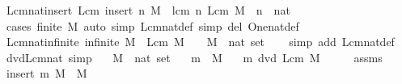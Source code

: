 \begin{isabellebody}
\ Lcm{\isacharunderscore}{\kern0pt}nat{\isacharunderscore}{\kern0pt}insert{\isacharcolon}{\kern0pt}\ {\isachardoublequoteopen}Lcm\ {\isacharparenleft}{\kern0pt}insert\ n\ M{\isacharparenright}{\kern0pt}\ {\isacharequal}{\kern0pt}\ lcm\ n\ {\isacharparenleft}{\kern0pt}Lcm\ M{\isacharparenright}{\kern0pt}{\isachardoublequoteclose}\ \ n\ {\isacharcolon}{\kern0pt}{\isacharcolon}{\kern0pt}\ nat\isanewline
%
\isadelimproof
\ \ %
\endisadelimproof
%
\isatagproof
{}\isamarkupfalse%
\ {\isacharparenleft}{\kern0pt}cases\ {\isachardoublequoteopen}finite\ M{\isachardoublequoteclose}{\isacharparenright}{\kern0pt}\ {\isacharparenleft}{\kern0pt}auto\ simp{\isacharcolon}{\kern0pt}\ Lcm{\isacharunderscore}{\kern0pt}nat{\isacharunderscore}{\kern0pt}def\ simp\ del{\isacharcolon}{\kern0pt}\ One{\isacharunderscore}{\kern0pt}nat{\isacharunderscore}{\kern0pt}def{\isacharparenright}{\kern0pt}%
\endisatagproof
{\isafoldproof}%
%
\isadelimproof
\isanewline
%
\endisadelimproof
\isanewline
{}\isamarkupfalse%
\ Lcm{\isacharunderscore}{\kern0pt}nat{\isacharunderscore}{\kern0pt}infinite{\isacharcolon}{\kern0pt}\ {\isachardoublequoteopen}infinite\ M\ {\isasymLongrightarrow}\ Lcm\ M\ {\isacharequal}{\kern0pt}\ {}{\isachardoublequoteclose}\ \ M\ {\isacharcolon}{\kern0pt}{\isacharcolon}{\kern0pt}\ {\isachardoublequoteopen}nat\ set{\isachardoublequoteclose}\isanewline
%
\isadelimproof
\ \ %
\endisadelimproof
%
\isatagproof
{}\isamarkupfalse%
\ {\isacharparenleft}{\kern0pt}simp\ add{\isacharcolon}{\kern0pt}\ Lcm{\isacharunderscore}{\kern0pt}nat{\isacharunderscore}{\kern0pt}def{\isacharparenright}{\kern0pt}%
\endisatagproof
{\isafoldproof}%
%
\isadelimproof
\isanewline
%
\endisadelimproof
\isanewline
{}\isamarkupfalse%
\ dvd{\isacharunderscore}{\kern0pt}Lcm{\isacharunderscore}{\kern0pt}nat\ {\isacharbrackleft}{\kern0pt}simp{\isacharbrackright}{\kern0pt}{\isacharcolon}{\kern0pt}\isanewline
\ \ \ M\ {\isacharcolon}{\kern0pt}{\isacharcolon}{\kern0pt}\ {\isachardoublequoteopen}nat\ set{\isachardoublequoteclose}\isanewline
\ \ \ {\isachardoublequoteopen}m\ {\isasymin}\ M{\isachardoublequoteclose}\isanewline
\ \ \ {\isachardoublequoteopen}m\ dvd\ Lcm\ M{\isachardoublequoteclose}\isanewline
%
\isadelimproof
%
\endisadelimproof
%
\isatagproof
{}\isamarkupfalse%
\ {\isacharminus}{\kern0pt}\isanewline
\ \ \isamarkupfalse%
\ assms\ \isamarkupfalse%
\ {\isachardoublequoteopen}insert\ m\ M\ {\isacharequal}{\kern0pt}\ M{\isachardoublequoteclose}\isanewline

\end{isabellebody}
